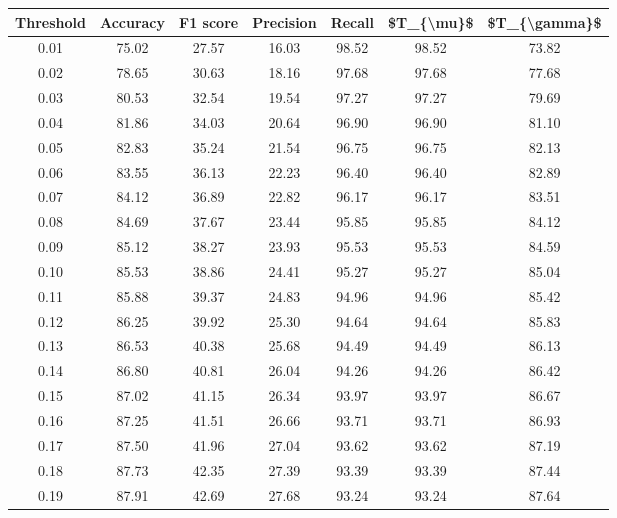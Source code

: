 \begin{tabular}{|c|c|c|c|c|c|c|}
\hline
 Threshold &  Accuracy &  F1 score &  Precision &  Recall &  \$T\_\{\textbackslash mu\}\$ &  \$T\_\{\textbackslash gamma\}\$ \\
\hline
      0.01 &     75.02 &     27.57 &      16.03 &   98.52 &      98.52 &         73.82 \\
      0.02 &     78.65 &     30.63 &      18.16 &   97.68 &      97.68 &         77.68 \\
      0.03 &     80.53 &     32.54 &      19.54 &   97.27 &      97.27 &         79.69 \\
      0.04 &     81.86 &     34.03 &      20.64 &   96.90 &      96.90 &         81.10 \\
      0.05 &     82.83 &     35.24 &      21.54 &   96.75 &      96.75 &         82.13 \\
      0.06 &     83.55 &     36.13 &      22.23 &   96.40 &      96.40 &         82.89 \\
      0.07 &     84.12 &     36.89 &      22.82 &   96.17 &      96.17 &         83.51 \\
      0.08 &     84.69 &     37.67 &      23.44 &   95.85 &      95.85 &         84.12 \\
      0.09 &     85.12 &     38.27 &      23.93 &   95.53 &      95.53 &         84.59 \\
      0.10 &     85.53 &     38.86 &      24.41 &   95.27 &      95.27 &         85.04 \\
      0.11 &     85.88 &     39.37 &      24.83 &   94.96 &      94.96 &         85.42 \\
      0.12 &     86.25 &     39.92 &      25.30 &   94.64 &      94.64 &         85.83 \\
      0.13 &     86.53 &     40.38 &      25.68 &   94.49 &      94.49 &         86.13 \\
      0.14 &     86.80 &     40.81 &      26.04 &   94.26 &      94.26 &         86.42 \\
      0.15 &     87.02 &     41.15 &      26.34 &   93.97 &      93.97 &         86.67 \\
      0.16 &     87.25 &     41.51 &      26.66 &   93.71 &      93.71 &         86.93 \\
      0.17 &     87.50 &     41.96 &      27.04 &   93.62 &      93.62 &         87.19 \\
      0.18 &     87.73 &     42.35 &      27.39 &   93.39 &      93.39 &         87.44 \\
      0.19 &     87.91 &     42.69 &      27.68 &   93.24 &      93.24 &         87.64 \\

\end{tabular}
